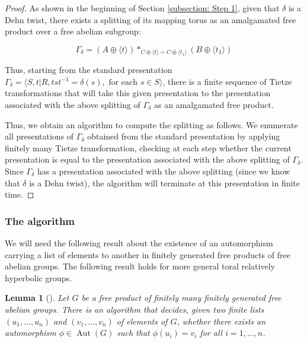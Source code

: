 \documentclass{amsart}
\DeclareMathOperator{\Aut}{Aut}
\theoremstyle{plain}
\newtheorem{lemma}[thm]{Lemma}
\theoremstyle{definition}
\theoremstyle{remark}
\begin{document}
\begin{proof}

As shown in the beginning of Section \ref{subsection: Step 1}, given that $\delta$ is a Dehn twist, there exists a splitting of its mapping torus as an amalgamated free product over a free abelian subgroup: 

$$\Gamma_{\delta} = (A \oplus \langle t \rangle) *_{C \oplus \langle t \rangle = C \oplus \langle t_1 \rangle} (B \oplus \langle t_1 \rangle)$$

Thus, starting from the standard presentation $\Gamma_{\delta} = \langle S, t \vert R, tst^{-1} = \delta(s), \text{ for each } s \in S \rangle$, there is a finite sequence of Tietze transformations that will take this given presentation to the presentation associated with the above splitting of $\Gamma_{\delta}$ as an amalgamated free product. 

Thus, we obtain an algorithm to compute the splitting as follows. We enumerate all presentations of $\Gamma_{\delta}$ obtained from the standard presentation by applying finitely many Tietze transformation, checking at each step whether the current presentation is equal to the presentation associated with the above splitting of $\Gamma_{\delta}$. Since $\Gamma_{\delta}$ has a presentation associated with the above splitting (since we know that $\delta$ is a Dehn twist), the algorithm will terminate at this presentation in finite time. 

\end{proof}



\subsubsection{The algorithm}

We will need the following result about the existence of an automorphism carrying a list of elements to another in finitely generated free products of free abelian groups. The following result holds for more general toral relatively hyperbolic groups. 

\begin{lemma} [\cite{Whitehead_for_toral_relatively_hyperbolic_groups}]
    \label{lemma: simultaneous whitehead algorithm}
    Let $G$ be a free product of finitely many finitely generated free abelian groups. There is an algorithm that decides, given two finite lists $(u_1,\ldots,u_n)$ and $(v_1,\ldots,v_n)$ of elements of $G$, whether there exists an automorphism $\phi \in \Aut(G)$ such that $\phi(u_i) = v_i$ for all $i = 1,\ldots,n$. 
\end{lemma}
\end{document}
